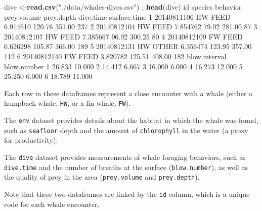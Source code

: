 \documentclass[
]{book}
\newenvironment{Shaded}{\begin{snugshade}}{\end{snugshade}}
\newcommand{\DecValTok}[1]{\textcolor[rgb]{0.00,0.00,0.81}{#1}}
\newcommand{\FloatTok}[1]{\textcolor[rgb]{0.00,0.00,0.81}{#1}}
\newcommand{\KeywordTok}[1]{\textcolor[rgb]{0.13,0.29,0.53}{\textbf{#1}}}
\newcommand{\NormalTok}[1]{#1}
\newcommand{\StringTok}[1]{\textcolor[rgb]{0.31,0.60,0.02}{#1}}
\begin{document}
\begin{Shaded}
\begin{Highlighting}[]
\NormalTok{dive <-}\KeywordTok{read.csv}\NormalTok{(}\StringTok{"./data/whales-dives.csv"}\NormalTok{) ; }\KeywordTok{head}\NormalTok{(dive)}
\NormalTok{           id species behavior prey.volume prey.depth dive.time surface.time}
\DecValTok{1} \DecValTok{20140811106}\NormalTok{      HW     FEED    }\FloatTok{6.914610}     \FloatTok{120.76}    \FloatTok{351.00}          \DecValTok{237}
\DecValTok{2} \DecValTok{20140812104}\NormalTok{      HW     FEED    }\FloatTok{7.854762}      \FloatTok{79.02}    \FloatTok{281.00}           \DecValTok{87}
\DecValTok{3} \DecValTok{20140812107}\NormalTok{      HW     FEED    }\FloatTok{7.385667}      \FloatTok{96.92}    \FloatTok{300.25}           \DecValTok{80}
\DecValTok{4} \DecValTok{20140812109}\NormalTok{      FW     FEED    }\FloatTok{6.626298}     \FloatTok{105.87}    \FloatTok{366.00}          \DecValTok{189}
\DecValTok{5} \DecValTok{20140812131}\NormalTok{      HW    OTHER    }\FloatTok{6.356474}     \FloatTok{123.95}    \FloatTok{357.00}          \DecValTok{112}
\DecValTok{6} \DecValTok{20140812140}\NormalTok{      FW     FEED    }\FloatTok{3.820782}     \FloatTok{125.51}    \FloatTok{408.00}          \DecValTok{182}
\NormalTok{  blow.interval blow.number}
\DecValTok{1}        \FloatTok{26.833}      \FloatTok{10.000}
\DecValTok{2}        \FloatTok{14.412}       \FloatTok{6.667}
\DecValTok{3}        \FloatTok{16.000}       \FloatTok{6.000}
\DecValTok{4}        \FloatTok{16.273}      \FloatTok{12.000}
\DecValTok{5}        \FloatTok{25.250}       \FloatTok{6.000}
\DecValTok{6}        \FloatTok{18.789}      \FloatTok{11.000}
\end{Highlighting}
\end{Shaded}

Each row in these dataframes represent a close encounter with a whale (either a humpback whale, \texttt{HW}, or a fin whale, \texttt{FW}).

The \texttt{env} dataset provides details about the habitat in which the whale was found, such as \texttt{seafloor} depth and the amount of \texttt{chlorophyll} in the water (a proxy for productivity).

The \texttt{dive} dataset provides measurements of whale foraging behaviors, such as \texttt{dive.time} and the number of breaths at the surface (\texttt{blow.number}), as well as the quality of prey in the area (\texttt{prey.volume} and \texttt{prey.depth}).

Note that these two dataframes are linked by the \texttt{id} column, which is a unique code for each whale encounter.
\end{document}
